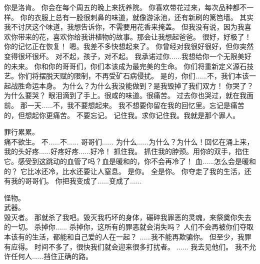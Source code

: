 \documentclass[openany]{book}
\begin{document}
\begin{dialogue}
     你是洛肯。
     你会在每个周五的晚上来抚养院。
     你喜欢带花过来，每次品种都不一样。
     你的衣服上总有一股很刺鼻的味道，就像游泳池，还有新刷的篱笆墙。
     其实我不讨厌这个味道，我想告诉你，不需要用花香来掩盖。
     但我没有说，因为我喜欢你带来的花，喜欢你给我讲植物的故事。那会让我想起爸爸。
     很好，好极了！你的记忆正在恢复！
     嗯。我差不多快想起来了。
     你曾经对我很好很好，但你突然变得很坏很坏。
     对不起，孩子，对不起。
     我承诺过你......我想给你一个无限美好的未来。
     你和你的哥哥们，你们本该成为最完美的生命。
     你们将重新定义源石技艺。你们将摆脱天赋的限制，不再受矿石病侵扰。
     是的，你们......不，我们本该一起战胜命运本身。
     为什么？为什么我没能做到？是我毁掉了我们双方！
     你哭了？为什么要哭？
     眼泪滴到了手上。很咸的味道。很痛苦。
     过去你也哭过，就在我面前。
     那一天......不，我不要想起来。
     我不想要你留在我的回忆里。忘记是痛苦的，但想起你更痛苦。
     不要忘记。
     记住我。求你记住我。我就是那个罪人。\par
    罪行累累。\\
    痛不欲生。
     不......不......
     哥哥们......
     为什么......为什么？为什么！回忆在涌上来，我的头好疼......好疼好疼......好冷！
     抓住我。
     抓住我的脖颈。用你的双手，掐住它。感受到这跳动的血管了吗？血是暖和的，你不会再冷了！
     血......怎么会是暖和的？
     它比冰还冷，比水还要让人窒息。
     是你。
     全是你。
     你夺走了我的生活，还有我的哥哥们。
     你把我变成了......变成了......\par
    怪物。\\
    武器。\\
    毁灭者。
     那就杀了我吧。毁灭我朽坏的身体，碾碎我罪恶的灵魂，来祭奠你失去的一切。
     杀掉你......
     杀掉你，这所有的罪恶就会消失吗？
     人们不会再被你们夺取本该有的生活，都能和自己爱的人在一起？
     ......我不能再欺骗你。
     但至少，我罪有应得。
     时间不多了，很快我们就会迎来很多打扰者。
     ......
     我去见他们。
     我不允许任何人......挡住正确的路。
\end{dialogue}
\end{document}
